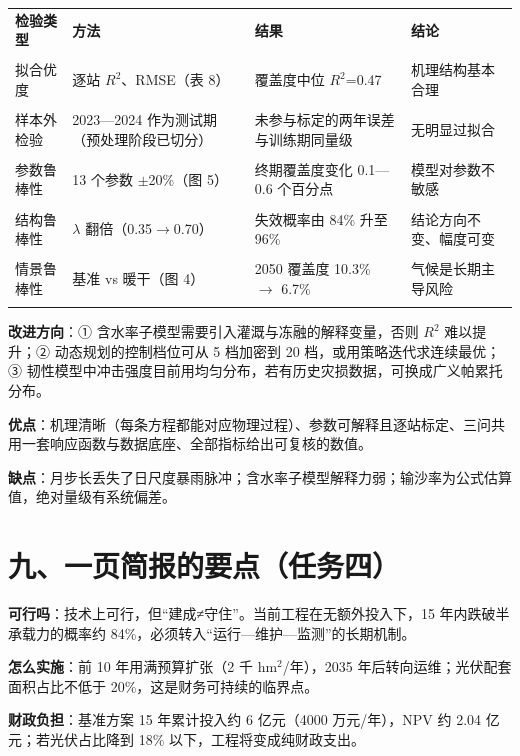 \documentclass[11pt,a4paper]{ctexart}
\begin{document}
\begin{table}[H]\centering\small\setlength{\parskip}{2pt}
\begin{tabularx}{\textwidth}{|X|X|X|X|}
\toprule
\textbf{检验类型} & \textbf{方法} & \textbf{结果} & \textbf{结论} \\\\
\midrule
拟合优度 & 逐站 $R^{2}$、RMSE（表 8） & 覆盖度中位 $R^{2}$=0.47 & 机理结构基本合理 \\\\
样本外检验 & 2023—2024 作为测试期（预处理阶段已切分） & 未参与标定的两年误差与训练期同量级 & 无明显过拟合 \\\\
参数鲁棒性 & 13 个参数 $\pm$20\%（图 5） & 终期覆盖度变化 0.1—0.6 个百分点 & 模型对参数不敏感 \\\\
结构鲁棒性 & ${\lambda}$ 翻倍（0.35$\to$0.70） & 失效概率由 84\% 升至 96\% & 结论方向不变、幅度可变 \\\\
情景鲁棒性 & 基准 vs 暖干（图 4） & 2050 覆盖度 10.3\% $\to$ 6.7\% & 气候是长期主导风险 \\\\
\bottomrule
\end{tabularx}
\end{table}
\textbf{改进方向}：① 含水率子模型需要引入灌溉与冻融的解释变量，否则 $R^{2}$ 难以提升；② 动态规划的控制档位可从 5 档加密到 20 档，或用策略迭代求连续最优；③ 韧性模型中冲击强度目前用均匀分布，若有历史灾损数据，可换成广义帕累托分布。

\textbf{优点}：机理清晰（每条方程都能对应物理过程）、参数可解释且逐站标定、三问共用一套响应函数与数据底座、全部指标给出可复核的数值。

\textbf{缺点}：月步长丢失了日尺度暴雨脉冲；含水率子模型解释力弱；输沙率为公式估算值，绝对量级有系统偏差。


\section*{九、一页简报的要点（任务四）}
\textbf{可行吗}：技术上可行，但“建成≠守住”。当前工程在无额外投入下，15 年内跌破半承载力的概率约 84\%，必须转入“运行—维护—监测”的长期机制。

\textbf{怎么实施}：前 10 年用满预算扩张（2 千 hm$^{2}$/年），2035 年后转向运维；光伏配套面积占比不低于 20\%，这是财务可持续的临界点。

\textbf{财政负担}：基准方案 15 年累计投入约 6 亿元（4000 万元/年），NPV 约 2.04 亿元；若光伏占比降到 18\% 以下，工程将变成纯财政支出。
\end{document}
